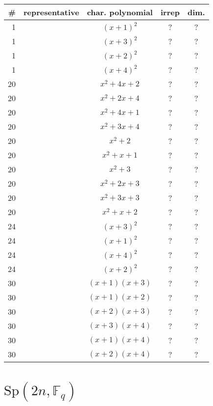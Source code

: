 \documentclass[11pt,oneside]{article}
\newcommand{\Sp}{\mathrm{Sp}}
\newcommand{\Field}{\mathbb{F}}
\begin{document}
\begin{center}
\begin{tabular}{r|l|c|c|c}
\# & representative & char. polynomial & irrep & dim. \\
\hline
1  &   & $(x+1)^2$  & ? & ?  \\
1  &   & $(x+3)^2$  & ? & ?  \\
1  &   & $(x+2)^2$  & ? & ?  \\
1  &   & $(x+4)^2$  & ? & ?  \\
20  &   & $x^2+4x+2$  & ? & ?  \\
20  &   & $x^2+2x+4$  & ? & ?  \\
20  &   & $x^2+4x+1$  & ? & ?  \\
20  &   & $x^2+3x+4$  & ? & ?  \\
20  &   & $x^2+2$  & ? & ?  \\
20  &   & $x^2+x+1$  & ? & ?  \\
20  &   & $x^2+3$  & ? & ?  \\
20  &   & $x^2+2x+3$  & ? & ?  \\
20  &   & $x^2+3x+3$  & ? & ?  \\
20  &   & $x^2+x+2$  & ? & ?  \\
24  &   & $(x+3)^2$  & ? & ?  \\
24  &   & $(x+1)^2$  & ? & ?  \\
24  &   & $(x+4)^2$  & ? & ?  \\
24  &   & $(x+2)^2$  & ? & ?  \\
30  &   & $(x+1)(x+3)$  & ? & ?  \\
30  &   & $(x+1)(x+2)$  & ? & ?  \\
30  &   & $(x+2)(x+3)$  & ? & ?  \\
30  &   & $(x+3)(x+4)$  & ? & ?  \\
30  &   & $(x+1)(x+4)$  & ? & ?  \\
30  &   & $(x+2)(x+4)$  & ? & ?  \\
\end{tabular}
\end{center}





\section{$\Sp(2n,\Field_q)$}

% 
\end{document}

